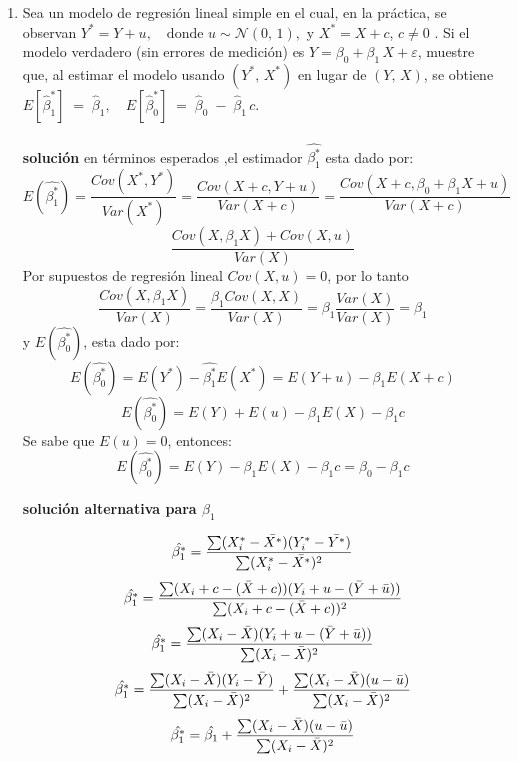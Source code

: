 \documentclass[10pt,a4paper]{article}
\begin{document}
\begin{enumerate}
\[
SST=\sum (Y_i-\bar Y)^2 = 13.4286,
\qquad
SSE=SST-SSR=12.6633.
\]

\[
R^{2}
=\frac{SSE}{SST}
=1-\frac{SSR}{SST}
=1-\frac{0.7653}{13.4286}
=0.9430.
\]

Con \(n=7\) observaciones y \(k=3\) regresores:

\[
\boxed{
\bar R^{2}=1-\frac{SSR/(n-k-1)}{SST/(n-1)}
=1-\frac{0.7653/3}{13.4286/6}
=0.8860
}.
\]

\bigskip
\noindent\textbf{Resultados finales}

\[
\boxed{
\begin{aligned}
\hat\beta_0 &= -2.5544,&
\hat\beta_1 &= 0.7668,&
\hat\beta_2 &= 0.04516,&
\hat\beta_3 &= 0.01077;\\
R^{2} &= 0.9430,&
\bar R^{2} &= 0.8860.&
\end{aligned}}
\]

\\


\item Sea un modelo de regresión lineal simple en el cual, en la práctica, se observan $
Y^* = Y + u, \quad \text{donde } u \sim \mathcal{N}(0,\,1),
$ y $
X^* = X + c$, \quad {} $c \neq 0$ . Si el modelo verdadero (sin errores de medición) es $
Y = \beta_0 + \beta_1 \, X + \varepsilon$, muestre que, al estimar el modelo usando \((Y^*,\,X^*)\) en lugar de \((Y,\,X)\), se obtiene $E[\hat{\beta}_1^*] \;=\; \hat{\beta}_1,
\quad
E[\hat{\beta}_0^*] \;=\; \hat{\beta}_0 \;-\;\hat{\beta}_1 \, c.
$
\\
\\
\textbf{solución}
en términos esperados ,el estimador $\hat{\beta^*_1}$ esta dado por:
$$E(\hat{\beta^*_1})  =  \frac{Cov(X^*,Y^*)}{Var(X^*)} = \frac{Cov(X+c,Y+u)}{Var(X+c)}=\frac{Cov(X+c,\beta_0 + \beta_1X+u)}{Var(X+c)}$$
$$\frac{Cov(X,\beta_1X)+Cov(X,u)}{Var(X)}$$
Por supuestos de regresión lineal $Cov(X,u)=0$, por lo tanto
$$\frac{Cov(X,\beta_1X)}{Var(X)}=\frac{\beta_1Cov(X,X)}{Var(X)}=\beta_1\frac{Var(X)}{Var(X)}=\beta_1$$
y $E(\hat{\beta^*_0})$, esta dado por:
$$E(\hat{\beta^*_0})=E(Y^*)-\hat{\beta^*_1}E(X^*)=E(Y+u)-\beta_1E(X+c)$$
$$E(\hat{\beta^*_0}) = E(Y)+E(u)-\beta_1E(X)-\beta_1c$$
Se sabe que $E(u)=0$, entonces:
$$E(\hat{\beta^*_0}) = E(Y)-\beta_1E(X)-\beta_1c=\beta_0-\beta_1c$$

\textbf{solución alternativa para $\beta_1$}

$$\hat{\beta_1^*} = \frac{\sum (X_i^*-\Bar{X^*})(Y_i^*-\Bar{Y^*})}{\sum (X_i^*-\Bar{X^*})^2}$$
$$\hat{\beta_1^*} = \frac{\sum (X_i+c-(\Bar{X}+c))(Y_i+u-(\Bar{Y}+\Bar{u}))}{\sum (X_i+c-(\Bar{X}+c))^2}$$
$$\hat{\beta_1^*} = \frac{\sum (X_i-\Bar{X})(Y_i+u-(\Bar{Y}+\Bar{u}))}{\sum (X_i-\Bar{X})^2}$$
$$\hat{\beta_1^*} = \frac{\sum (X_i-\Bar{X})(Y_i-\Bar{Y})}{\sum (X_i-\Bar{X})^2} + \frac{\sum (X_i-\Bar{X})(u-\Bar{u})}{\sum (X_i-\Bar{X})^2}$$
$$\hat{\beta_1^*} = \hat{\beta_1} + \frac{\sum (X_i-\Bar{X})(u-\Bar{u})}{\sum (X_i-\Bar{X})^2}$$


\end{enumerate}
\end{document}

